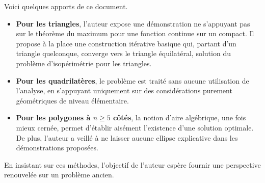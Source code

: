 Voici quelques apports de ce document.

\begin{itemize}
    \item \textbf{Pour les triangles}, l'auteur expose une démonstration ne s'appuyant pas sur le théorème du maximum pour une fonction continue sur un compact. Il propose à la place une construction itérative basique qui, partant d'un triangle quelconque, converge vers le triangle équilatéral, solution du problème d'isopérimétrie pour les triangles.
    
    \item \textbf{Pour les quadrilatères}, le problème est traité sans aucune utilisation de l'analyse, en s'appuyant uniquement sur des considérations purement géométriques de niveau élémentaire.

    \item \textbf{\boldmath Pour les polygones à $n \geq 5$ côtés}, la notion d'aire algébrique, une fois mieux cernée, permet d'établir aisément l'existence d'une solution optimale. De plus, l'auteur a veillé à ne laisser aucune ellipse explicative dans les démonstrations proposées.
\end{itemize}

En insistant sur ces méthodes, l'objectif de l'auteur espère fournir une perspective renouvelée sur un problème ancien.
